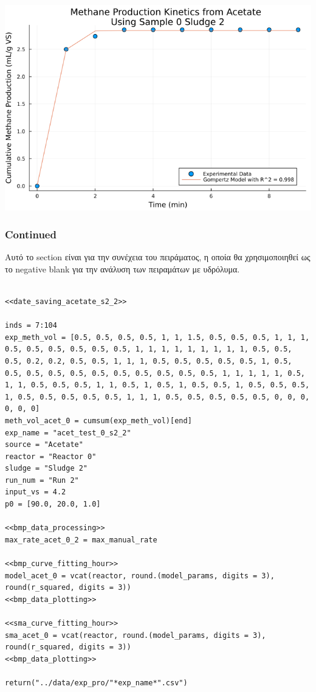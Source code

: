\documentclass[11pt]{article}
\begin{document}
\begin{center}
\includegraphics[width=.9\linewidth]{../plots/BMPs/Acetate/specific_methane_kinetics_acet_test_0_s2.png}
\end{center}

\subsubsection{Continued}
\label{sec:org44833b0}
Αυτό το section είναι για την συνέχεια του πειράματος, η οποία θα χρησιμοποιηθεί ως το negative blank για την ανάλυση των πειραμάτων με υδρόλυμα.

\begin{verbatim}

<<date_saving_acetate_s2_2>>

inds = 7:104
exp_meth_vol = [0.5, 0.5, 0.5, 0.5, 1, 1, 1.5, 0.5, 0.5, 0.5, 1, 1, 1, 0.5, 0.5, 0.5, 0.5, 0.5, 0.5, 1, 1, 1, 1, 1, 1, 1, 1, 1, 0.5, 0.5, 0.5, 0.2, 0.2, 0.5, 0.5, 1, 1, 1, 0.5, 0.5, 0.5, 0.5, 0.5, 1, 0.5, 0.5, 0.5, 0.5, 0.5, 0.5, 0.5, 0.5, 0.5, 0.5, 0.5, 1, 1, 1, 1, 1, 0.5, 1, 1, 0.5, 0.5, 0.5, 1, 1, 0.5, 1, 0.5, 1, 0.5, 0.5, 1, 0.5, 0.5, 0.5, 1, 0.5, 0.5, 0.5, 0.5, 0.5, 1, 1, 1, 0.5, 0.5, 0.5, 0.5, 0.5, 0, 0, 0, 0, 0, 0]
meth_vol_acet_0 = cumsum(exp_meth_vol)[end]
exp_name = "acet_test_0_s2_2"
source = "Acetate"
reactor = "Reactor 0"
sludge = "Sludge 2"
run_num = "Run 2"
input_vs = 4.2
p0 = [90.0, 20.0, 1.0]

<<bmp_data_processing>>
max_rate_acet_0_2 = max_manual_rate

<<bmp_curve_fitting_hour>>
model_acet_0 = vcat(reactor, round.(model_params, digits = 3), round(r_squared, digits = 3))
<<bmp_data_plotting>>

<<sma_curve_fitting_hour>>
sma_acet_0 = vcat(reactor, round.(model_params, digits = 3), round(r_squared, digits = 3))  
<<bmp_data_plotting>>

return("../data/exp_pro/"*exp_name*".csv")

\end{verbatim}
\end{document}
